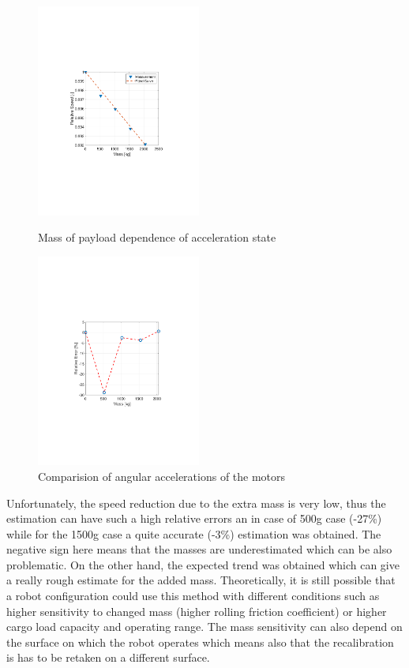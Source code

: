 \documentclass[12pt,english]{article}
\begin{document}
\begin{figure}[htb!]
	\centering
	\includegraphics[height=7cm]{figures/rolling_fric_meas}
	\caption{Mass of payload dependence of acceleration state}
	\label{rolling_fric_meas}
	\endminipage\hfill
	\centering
	\includegraphics[height=7cm]{figures/mass_estimate}
	\caption{Comparision of angular accelerations of the motors}
	\label{mass_estimate}
	\endminipage\hfill
\end{figure}
Unfortunately, the speed reduction due to the extra mass is very low, thus the estimation can have such a high relative errors an in case of 500g case (-27\%) while for the 1500g case a quite accurate (-3\%) estimation was obtained. The negative sign here means that the masses are underestimated which can be also problematic. On the other hand, the expected trend was obtained which can give a really rough estimate for the added mass. Theoretically, it is still possible that a robot configuration could use this method with different conditions such as higher sensitivity to changed mass (higher rolling friction coefficient) or higher cargo load capacity and operating range. The mass sensitivity can also depend on the surface on which the robot operates which means also that the recalibration is has to be retaken on a different surface.
\end{document}
